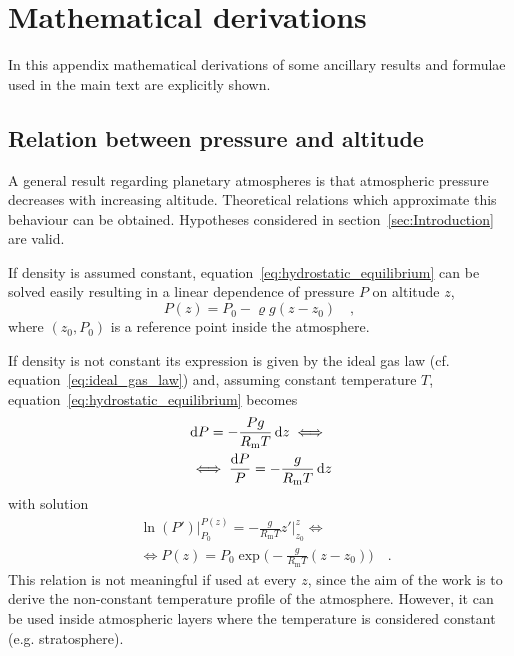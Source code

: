 \documentclass[a4paper,10pt,twocolumn,\classoptions]{article}
\begin{document}
\section{Mathematical derivations}
In this appendix mathematical derivations of some ancillary results and formulae used in the main text are explicitly shown.



\subsection{Relation between pressure and altitude}
\label{sec:Relation between pressure and altitude}
A general result regarding planetary atmospheres is that atmospheric pressure decreases with increasing altitude. Theoretical relations which approximate this behaviour can be obtained. Hypotheses considered in section~\ref{sec:Introduction} are valid.

If density is assumed constant, equation~\eqref{eq:hydrostatic_equilibrium} can be solved easily resulting in a linear dependence of pressure $P$ on altitude $z$,
\begin{equation}
  \label{eq:pressure_constant_density}
  P(z) = P_0 - \varrho g (z - z_0)
  \quad ,
\end{equation}
where $(z_0, P_0)$ is a reference point inside the atmosphere.

If density is not constant its expression is given by the ideal gas law (cf. equation~\eqref{eq:ideal_gas_law}) and, assuming constant temperature $T$, equation~\eqref{eq:hydrostatic_equilibrium} becomes
\begin{equation}
  \label{eq:hydrostatic_equilibrium_ideal_gas_law_constant_temperature}
  \begin{split}
    & \odif{P} = - \frac{P g}{R_\text{m} T} \odif{z} \iff \\
    & \iff \frac{\odif{P}}{P} = - \frac{g}{R_\text{m} T} \odif{z}
  \end{split}
\end{equation}
with solution
\begin{equation}
  \label{eq:pressure_constant_temperature}
  \begin{split}
    & \ln(P') \bigg|_{P_0}^{P(z)} = - \frac{g}{R_\text{m} T} z' \bigg|_{z_0}^{z} \iff \\
    & \iff P(z) = P_0 \exp{\bigg( - \frac{g}{R_\text{m} T} (z - z_0) \bigg)}
    \quad .
  \end{split}
\end{equation}
This relation is not meaningful if used at every $z$, since the aim of the work is to derive the non-constant temperature profile of the atmosphere. However, it can be used inside atmospheric layers where the temperature is considered constant (e.g. stratosphere).
\end{document}
